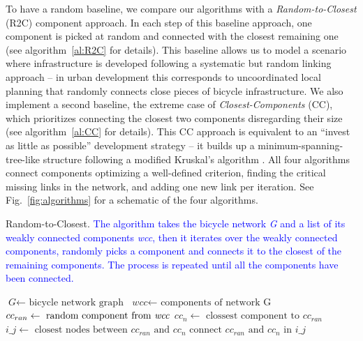 To have a random baseline, we compare our algorithms with a \emph{Random-to-Closest} (R2C) component approach. In each step of this baseline approach, one component is picked at random and connected with the closest remaining one (see algorithm~\ref{al:R2C} for details). This baseline allows us to model a scenario where infrastructure is developed following a systematic but random linking approach -- in urban development this corresponds to uncoordinated local planning that randomly connects close pieces of bicycle infrastructure. We also implement a second baseline, the extreme case of \emph{Closest-Components} (CC), which prioritizes connecting the closest two components disregarding their size (see algorithm~\ref{al:CC} for details). This CC approach is equivalent to an ``invest as little as possible'' development strategy -- it builds up a minimum-spanning-tree-like structure  following a modified Kruskal's algorithm \cite{Kruskal1956Spanning}. All four algorithms connect components optimizing a well-defined criterion, finding the critical missing links in the network, and adding one new link per iteration. See Fig.~\ref{fig:algorithms} for a schematic of the four algorithms.


\begin{algorithm}[h!]
  \caption{Random-to-Closest. \textcolor{blue}{The algorithm takes the bicycle network \textit{G} and a list of its weakly connected components \textit{wcc}, then it iterates over the weakly connected components, randomly picks a component and connects it to the closest of the remaining components. The process is repeated until all the components have been connected.}}\label{al:R2C}
  \begin{algorithmic}[1]
    \State $\textit{G} \gets \text{ bicycle network graph}$
    \State $\textit{wcc} \gets \text{ components of network G}$
    \State $cc_{ran} \gets \text{ random component from \textit{wcc}}$
    \State $cc_n \gets \text{ clossest component to } cc_{ran}$
    \State $\textit{i\_j} \gets \text{ closest nodes between } cc_{ran} \text{ and } cc_n$
    \State $\text{connect } cc_{ran} \text{ and } cc_n \text{ in } i\_j$
    \EndFor
    \EndProcedure
  \end{algorithmic}
\end{algorithm}

